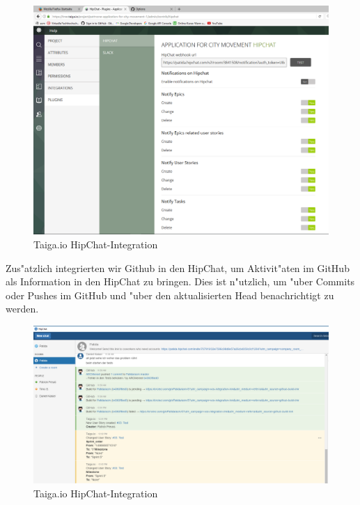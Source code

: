 \documentclass[a4paper, 11pt]{scrreprt}
\begin{document}
\begin{figure} [H]
\begin{center}

\includegraphics[width=16cm]{hipchat.png}
\caption{Taiga.io HipChat-Integration}

\end{center}
\end{figure}

Zus"atzlich integrierten wir Github in den HipChat, um Aktivit"aten im GitHub als Information in den HipChat zu bringen.
Dies ist n"utzlich, um "uber Commits oder Pushes im GitHub und "uber den aktualisierten Head benachrichtigt zu werden.

\begin{figure} [H]
\begin{center}


\includegraphics[width=16cm]{info_taiga_github_hipchat.png}
\caption{Taiga.io HipChat-Integration}

\end{center}
\end{figure}
\end{document}

